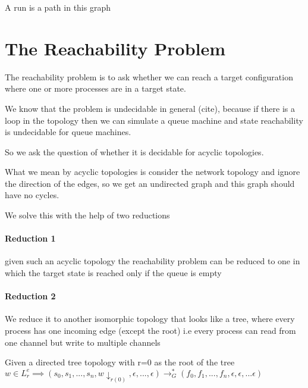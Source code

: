 \documentclass[a4paper,UKenglish,cleveref, autoref, thm-restate]{lipics-v2019}
\begin{document}
A run is a path in this graph 


\section{The Reachability Problem}

The reachability problem is to ask whether we can reach a target configuration where one or more processes are in a target state.

We know that the problem is undecidable in general (cite), because if there is a loop in the topology then we can simulate a queue machine and state reachability is undecidable for queue machines. 

So we ask the question of whether it is decidable for acyclic topologies.

What we mean by acyclic topologies is consider the network topology and ignore the direction of the edges, so we get an undirected graph and this graph should have no cycles.

We solve this with the help of two reductions

\paragraph*{Reduction 1}

given such an acyclic topology the reachability problem can be reduced to one in which the target state is reached only if the queue is empty \cite{CQS}

\paragraph*{Reduction 2}
We reduce it to another isomorphic topology that looks like a tree, where every process has one incoming edge (except the root) i.e every process can read from one channel but write to multiple channels \cite{CQS}




    

\begin{lemma}\label{testenv-lemma}
Given a directed tree topology with r=0 as the root of the tree
$w \in L_r^e \implies (s_0, s_1, ...,s_n, w \downarrow_{r(0)}, \epsilon, ...,\epsilon) \rightarrow_G^* (f_0, f_1, ..., f_n, \epsilon, \epsilon, ... \epsilon)$
\end{lemma}
   
\end{document}
